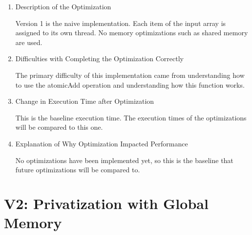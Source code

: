 \documentclass{article}
\begin{document}
\begin{enumerate}
	\item Description of the Optimization
	
	Version 1 is the naive implementation. Each item of the input array is assigned to its own thread. No memory optimizations such as shared memory are used. 
	
	\item Difficulties with Completing the Optimization Correctly
	
	The primary difficulty of this implementation came from understanding how to use the atomicAdd operation and understanding how this function works.
	
	\item Change in Execution Time after Optimization
	
	This is the baseline execution time. The execution times of the optimizations will be compared to this one. 
	
	\item Explanation of Why Optimization Impacted Performance
	
	No optimizations have been implemented yet, so this is the baseline that future optimizations will be compared to. 
	
\end{enumerate}

\section{V2: Privatization with Global Memory}
\end{document}

